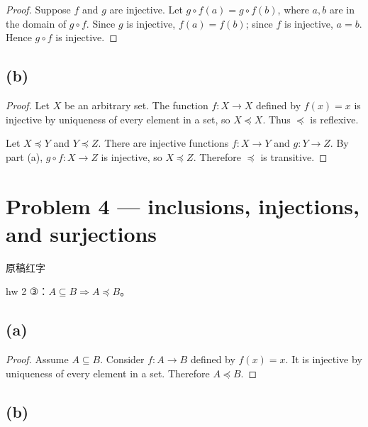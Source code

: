 \begin{proof}

Suppose \(f\) and \(g\) are injective. Let \(g \circ f(a) = g \circ f(b)\), where \(a,b\) are in the domain of \(g \circ f\). Since \(g\) is injective, \(f(a) = f(b)\); since \(f\) is injective, \(a = b\). Hence \(g \circ f\) is injective.

\end{proof}

\subsection{(b)}

\begin{proof}

Let \(X\) be an arbitrary set. The function \(f:X\rightarrow X\) defined by \(f(x) = x\) is injective by uniqueness of every element in a set, so \(X \preceq X\). Thus \(\preceq\) is reflexive.

Let \(X \preceq Y\) and \(Y \preceq Z\). There are injective functions \(f:X\rightarrow Y\) and \(g:Y\rightarrow Z\). By part (a), \(g \circ f:X\rightarrow Z\) is injective, so \(X \preceq Z\). Therefore \(\preceq\) is transitive.

\end{proof}

\section{Problem 4 --- inclusions, injections, and surjections}

\begin{qlnote}{原稿红字}

hw 2 ③：\(A \subseteq B\Rightarrow A \preceq B\)。

\end{qlnote}

\subsection{(a)}

\begin{proof}

Assume \(A \subseteq B\). Consider \(f:A\rightarrow B\) defined by \(f(x) = x\). It is injective by uniqueness of every element in a set. Therefore \(A \preceq B\).

\end{proof}

\subsection{(b)}

